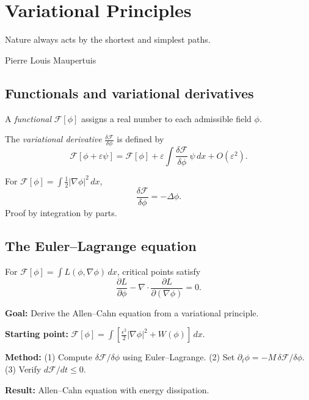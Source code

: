 
\chapter{Variational Principles}
\label{ch:variational}

\epigraph{%
  Nature always acts by the shortest and simplest paths.%
}{Pierre Louis Maupertuis}

\section{Functionals and variational derivatives}

\begin{definition}[Functional]
  A \emph{functional} $\mathcal{F}[\phi]$ assigns a real number
  to each admissible field $\phi$.
\end{definition}

\begin{definition}
  The \emph{variational derivative} $\frac{\delta\mathcal{F}}{\delta\phi}$
  is defined by
  \[
    \mathcal{F}[\phi + \varepsilon\psi]
    = \mathcal{F}[\phi]
    + \varepsilon \int \frac{\delta\mathcal{F}}{\delta\phi}\,\psi\,dx
    + O(\varepsilon^2).
  \]
\end{definition}

\begin{example}
  For $\mathcal{F}[\phi] = \int \frac{1}{2}|\nabla\phi|^2\,dx$,
  \[
    \frac{\delta\mathcal{F}}{\delta\phi} = -\Delta\phi.
  \]
  Proof by integration by parts.
\end{example}

\section{The Euler--Lagrange equation}

\begin{theorem}
  For $\mathcal{F}[\phi] = \int L(\phi, \nabla\phi)\,dx$,
  critical points satisfy
  \[
    \frac{\partial L}{\partial \phi}
    - \nabla \cdot \frac{\partial L}{\partial(\nabla\phi)}
    = 0.
  \]
\end{theorem}

\begin{DerivRoadmap}
  \textbf{Goal:} Derive the Allen--Cahn equation from a
  variational principle.

  \textbf{Starting point:}
  $\mathcal{F}[\phi] = \int [\frac{\epsilon^2}{2}|\nabla\phi|^2
  + W(\phi)]\,dx$.

  \textbf{Method:}
  (1) Compute $\delta\mathcal{F}/\delta\phi$ using Euler--Lagrange.
  (2) Set $\partial_t\phi = -M\,\delta\mathcal{F}/\delta\phi$.
  (3) Verify $d\mathcal{F}/dt \leq 0$.

  \textbf{Result:} Allen--Cahn equation with energy dissipation.
\end{DerivRoadmap}

